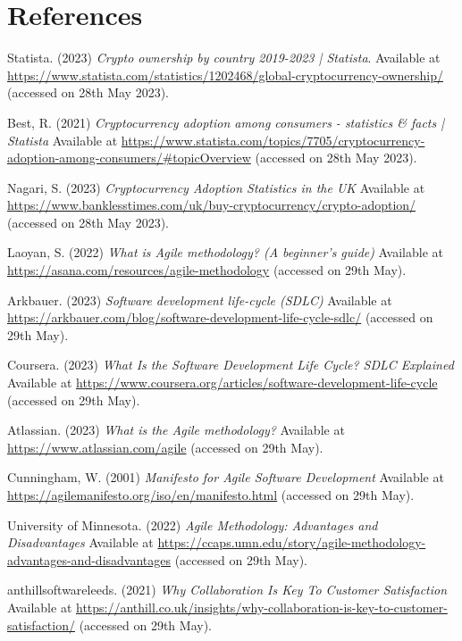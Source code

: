 \section{References}

\noindent [1] Statista. (2023) \textit{Crypto ownership by country 2019-2023 | Statista}. Available at \url{https://www.statista.com/statistics/1202468/global-cryptocurrency-ownership/} (accessed on 28th May 2023).
\vspace{0.2cm}

\noindent [2] Best, R. (2021) \textit{Cryptocurrency adoption among consumers - statistics \& facts | Statista} Available at \url{https://www.statista.com/topics/7705/cryptocurrency-adoption-among-consumers/#topicOverview} (accessed on 28th May 2023).
\vspace{0.2cm}

\noindent [3] Nagari, S. (2023) \textit{Cryptocurrency Adoption Statistics in the UK} Available at \url{https://www.banklesstimes.com/uk/buy-cryptocurrency/crypto-adoption/} (accessed on 28th May 2023).
\vspace{0.2cm}

\noindent [4] Laoyan, S. (2022) \textit{What is Agile methodology? (A beginner's guide)} Available at \url{https://asana.com/resources/agile-methodology} (accessed on 29th May).
\vspace{0.2cm}

\noindent [5] Arkbauer. (2023) \textit{Software development life-cycle (SDLC)} Available at \url{https://arkbauer.com/blog/software-development-life-cycle-sdlc/} (accessed on 29th May).
\vspace{0.2cm}

\noindent [6] Coursera. (2023) \textit{What Is the Software Development Life Cycle? SDLC Explained} Available at \url{https://www.coursera.org/articles/software-development-life-cycle} (accessed on 29th May).
\vspace{0.2cm}

\noindent [7] Atlassian. (2023) \textit{What is the Agile methodology?} Available at \url{https://www.atlassian.com/agile} (accessed on 29th May).
\vspace{0.2cm}

\noindent [8] Cunningham, W. (2001) \textit{Manifesto for Agile Software Development} Available at \url{https://agilemanifesto.org/iso/en/manifesto.html} (accessed on 29th May).
\vspace{0.2cm}

\noindent [9] University of Minnesota. (2022) \textit{Agile Methodology: Advantages and Disadvantages} Available at \url{https://ccaps.umn.edu/story/agile-methodology-advantages-and-disadvantages} (accessed on 29th May).
\vspace{0.2cm}

\noindent [10] anthillsoftwareleeds. (2021) \textit{Why Collaboration Is Key To Customer Satisfaction} Available at \url{https://anthill.co.uk/insights/why-collaboration-is-key-to-customer-satisfaction/} (accessed on 29th May).
\vspace{0.2cm}

\newpage